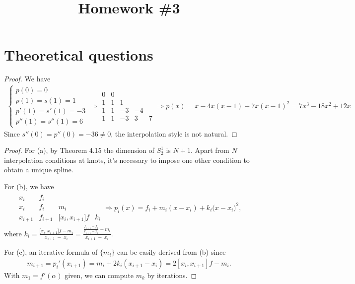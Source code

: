 \documentclass{article}
\newcommand{\RNum}[1]{\uppercase\expandafter{\romannumeral #1\relax}}
\begin{document}
\title{Homework \#3}
\pagestyle{fancy}

\section{Theoretical questions}

\RNum{1}
\begin{proof}
  We have 
  \begin{align*}
    \left\{\begin{array}{l}p(0)=0\\p(1)=s(1)=1\\p'(1)=s'(1)=-3\\p''(1)=s''(1)=6\end{array}\Rightarrow\begin{array}{c|cccc}0&0&&&\\1&1&1&&\\1&1&-3&-4&\\1&1&-3&3&7\end{array}\right.\Rightarrow p(x)=x-4x(x-1)+7x(x-1)^2=7x^3-18x^2+12x
  \end{align*}
  Since $s''(0)=p''(0)=-36 \neq 0$, the interpolation style is not natural.
\end{proof}

\RNum{2}
\begin{proof}
  For (a), by Theorem 4.15 the dimension of $S^1_2$ is $N+1$. Apart from $N$ interpolation conditions at knots, it's 
  necessary to impose one other condition to obtain a unique spline.

  For (b), we have
  \begin{align*}
    \begin{array}{c|ccc}x_i&f_i&&\\x_i&f_i&m_i&\\x_{i+1}&f_{i+1}&\lbrack x_i,x_{i+1}\rbrack f&k_i\end{array}\Rightarrow p_i(x)=f_i+m_i(x-x_i)+k_i(x-x_i{)^2,}
  \end{align*}
  where $k_i=\frac{\lbrack x_i,x_{i+1}\rbrack f-m_i}{x_{i+1}\;-\;x_i}=\frac{\frac{f_{i+1}-f_i}{x_{i+1}-x_i}-m_i}{x_{i+1}\;-\;x_i}.$

  For (c), an iterative formula of $\{m_i\}$ can be easily derived from (b) since 
  \begin{align*}
    m_{i+1}=p_i'(x_{i+1})=m_i+2k_i(x_{i+1}-x_i)=2[x_i,x_{i+1}]f-m_i.
  \end{align*}
  With $m_1=f'(\alpha)$ given, we can compute $m_k$ by iterations.
\end{proof}
\end{document}
